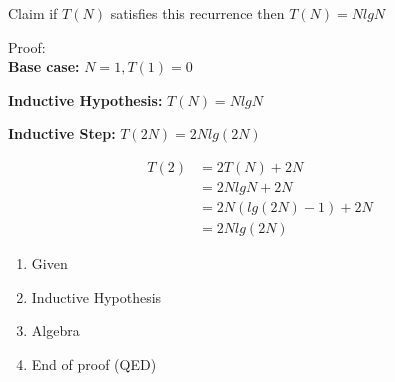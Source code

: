 \documentclass[]{article}
\begin{document}
{Claim if $T(N)$ satisfies this recurrence then $T(N) = NlgN$

Proof: \\

\textbf{Base case: } $N = 1, T(1) = 0$

\textbf{Inductive Hypothesis: } $T(N) = NlgN$

\textbf{Inductive Step: } $T(2N) = 2Nlg(2N)$

\begin{align}
T(2) &= 2T(N) + 2N\\
	 &= 2NlgN + 2N\\
	 &= 2N(lg(2N) - 1) + 2N\\
	 &= 2Nlg(2N)
\end{align}

\begin{enumerate}
\item{Given}
\item{Inductive Hypothesis}
\item{Algebra}
\item{End of proof (QED)}
\end{enumerate}

}
\end{document}
